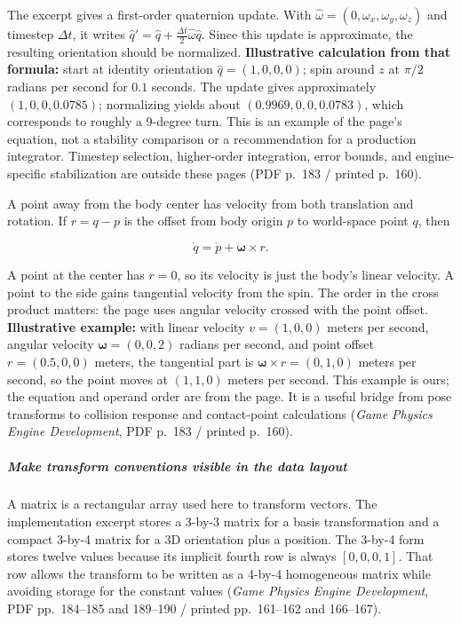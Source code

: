 The excerpt gives a first-order quaternion update. With \(\hat{\omega}=(0,\omega_x,\omega_y,\omega_z)\) and timestep \(\Delta t\), it writes \(\hat q' = \hat q + \frac{\Delta t}{2}\hat{\omega}\hat q\). Since this update is approximate, the resulting orientation should be normalized. \textbf{Illustrative calculation from that formula:} start at identity orientation \(\hat q=(1,0,0,0)\); spin around \(z\) at \(\pi/2\) radians per second for \(0.1\) seconds. The update gives approximately \((1,0,0,0.0785)\); normalizing yields about \((0.9969,0,0,0.0783)\), which corresponds to roughly a 9-degree turn. This is an example of the page's equation, not a stability comparison or a recommendation for a production integrator. Timestep selection, higher-order integration, error bounds, and engine-specific stabilization are outside these pages (PDF p.~183 / printed p.~160).

A point away from the body center has velocity from both translation and rotation. If \(r=q-p\) is the offset from body origin \(p\) to world-space point \(q\), then

\[
\dot q = \dot p + \boldsymbol{\omega} \times r.
\]

A point at the center has \(r=0\), so its velocity is just the body's linear velocity. A point to the side gains tangential velocity from the spin. The order in the cross product matters: the page uses angular velocity crossed with the point offset. \textbf{Illustrative example:} with linear velocity \(v=(1,0,0)\) meters per second, angular velocity \(\boldsymbol{\omega}=(0,0,2)\) radians per second, and point offset \(r=(0.5,0,0)\) meters, the tangential part is \(\boldsymbol{\omega}\times r=(0,1,0)\) meters per second, so the point moves at \((1,1,0)\) meters per second. This example is ours; the equation and operand order are from the page. It is a useful bridge from pose transforms to collision response and contact-point calculations (\emph{Game Physics Engine Development}, PDF p.~183 / printed p.~160).

\subparagraph{Make transform conventions visible in the data layout}\label{make-transform-conventions-visible-in-the-data-layout}

A matrix is a rectangular array used here to transform vectors. The implementation excerpt stores a 3-by-3 matrix for a basis transformation and a compact 3-by-4 matrix for a 3D orientation plus a position. The 3-by-4 form stores twelve values because its implicit fourth row is always \([0,0,0,1]\). That row allows the transform to be written as a 4-by-4 homogeneous matrix while avoiding storage for the constant values (\emph{Game Physics Engine Development}, PDF pp.~184--185 and 189--190 / printed pp.~161--162 and 166--167).

